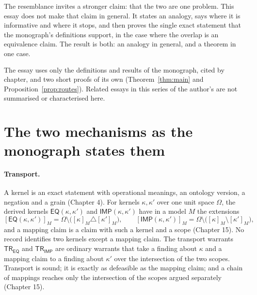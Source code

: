 \documentclass[11pt]{article}
\theoremstyle{plain}
\theoremstyle{definition}
\theoremstyle{remark}
\newcommand{\Om}{\Omega}
\newcommand{\EQ}{\mathsf{EQ}}
\newcommand{\IMP}{\mathsf{IMP}}
\newcommand{\TR}{\mathsf{TR}}
\newcommand{\ext}[2]{[#1]_{#2}}
\begin{document}
The resemblance invites a stronger claim: that the two are one problem. This essay does not make that claim in general. It states an analogy, says where it is informative and where it stops, and then proves the single exact statement that the monograph's definitions support, in the case where the overlap is an equivalence claim. The result is both: an analogy in general, and a theorem in one case.

The essay uses only the definitions and results of the monograph, cited by chapter, and two short proofs of its own (Theorem~\ref{thm:main} and Proposition~\ref{prop:routes}). Related essays in this series of the author's are not summarised or characterised here.

\section{The two mechanisms as the monograph states them}\label{sec:recall}

\paragraph{Transport.} A kernel is an exact statement with operational meanings, an ontology version, a negation and a grain (Chapter 4). For kernels $\kappa,\kappa'$ over one unit space $\Om$, the derived kernels $\EQ(\kappa,\kappa')$ and $\IMP(\kappa,\kappa')$ have in a model $M$ the extensions
\[
\ext{\EQ(\kappa,\kappa')}{M}=\Om\setminus\bigl(\ext{\kappa}{M}\triangle\ext{\kappa'}{M}\bigr),\qquad
\ext{\IMP(\kappa,\kappa')}{M}=\Om\setminus\bigl(\ext{\kappa}{M}\setminus\ext{\kappa'}{M}\bigr),
\]
and a mapping claim is a claim with such a kernel and a scope (Chapter 15). No record identifies two kernels except a mapping claim. The transport warrants $\TR_{\EQ}$ and $\TR_{\IMP}$ are ordinary warrants that take a finding about $\kappa$ and a mapping claim to a finding about $\kappa'$ over the intersection of the two scopes. Transport is sound; it is exactly as defeasible as the mapping claim; and a chain of mappings reaches only the intersection of the scopes argued separately (Chapter 15).
\end{document}
